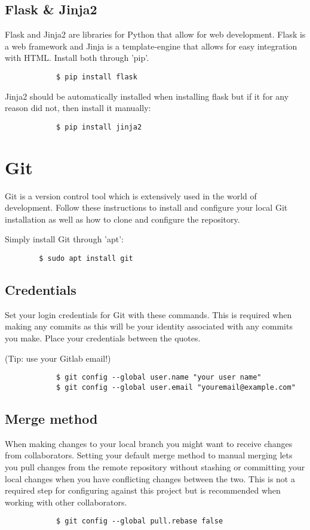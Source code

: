\documentclass{liu_mall_engelska}
\begin{document}
    \subsection{Flask \& Jinja2}
        Flask and Jinja2 are libraries for Python that allow for web development. Flask is a web framework and Jinja is a template-engine that allows for easy integration with HTML. Install both through 'pip'.
        \begin{lstlisting}
            $ pip install flask
        \end{lstlisting}

        Jinja2 should be automatically installed when installing flask but if it for any reason did not, then install it manually:
        \begin{lstlisting}
            $ pip install jinja2
        \end{lstlisting}

\newpage
\section{Git}
    Git is a version control tool which is extensively used in the world of development. Follow these instructions to install and configure your local Git installation as well as how to clone and configure the repository.

    Simply install Git through 'apt':
    \begin{lstlisting}
        $ sudo apt install git
    \end{lstlisting}

    \subsection{Credentials}
        Set your login credentials for Git with these commands. This is required when making any commits as this will be your identity associated with any commits you make. Place your credentials between the quotes.\par (Tip: use your Gitlab email!)
        \begin{lstlisting}
            $ git config --global user.name "your user name"
            $ git config --global user.email "youremail@example.com"
        \end{lstlisting}

    \subsection{Merge method}
        When making changes to your local branch you might want to receive changes from collaborators. Setting your default merge method to manual merging lets you pull changes from the remote repository without stashing or committing your local changes when you have conflicting changes between the two. This is not a required step for configuring against this project but is recommended when working with other collaborators.
        \begin{lstlisting}
            $ git config --global pull.rebase false
        \end{lstlisting}
\end{document}
